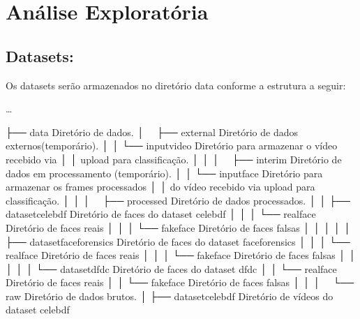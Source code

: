 \documentclass[letterpaper,10pt,brazil]{sphinxmanual}
\begin{document}
\chapter{Análise Exploratória}
\label{\detokenize{notebooks/0_EDA:analise-exploratoria}}\label{\detokenize{notebooks/0_EDA::doc}}

\section{Datasets:}
\label{\detokenize{notebooks/0_EDA:datasets}}
\sphinxAtStartPar
Os datasets serão armazenados no diretório data conforme a estrutura a seguir:

\sphinxAtStartPar
…

\begin{sphinxVerbatim}[commandchars=\\\{\}]
├── data                            \PYGZlt{}\PYGZhy{} Diretório de dados.
│   ├── external                    \PYGZlt{}\PYGZhy{} Diretório de dados externos(temporário).
│   │   └── input\PYGZus{}video             \PYGZlt{}\PYGZhy{} Diretório para armazenar o vídeo recebido via 
│   │                                  upload para classificação.
│   │   
│   ├── interim                     \PYGZlt{}\PYGZhy{} Diretório de dados em processamento (temporário).
│   │   └── input\PYGZus{}face              \PYGZlt{}\PYGZhy{} Diretório para armazenar os frames processados 
│   │                                  do vídeo recebido via upload para classificação.
│   │
│   ├── processed                   \PYGZlt{}\PYGZhy{} Diretório de dados processados.
│   │   ├── dataset\PYGZus{}celebdf         \PYGZlt{}\PYGZhy{} Diretório de faces do dataset celebdf
│   │   │   └── real\PYGZus{}face           \PYGZlt{}\PYGZhy{} Diretório de faces reais
│   │   │   └── fake\PYGZus{}face           \PYGZlt{}\PYGZhy{} Diretório de faces falsas
│   │   │
│   │   ├── dataset\PYGZus{}faceforensics   \PYGZlt{}\PYGZhy{} Diretório de faces do dataset faceforensics
│   │   │   └── real\PYGZus{}face           \PYGZlt{}\PYGZhy{} Diretório de faces reais
│   │   │   └── fake\PYGZus{}face           \PYGZlt{}\PYGZhy{} Diretório de faces falsas
│   │   │
│   │   └── dataset\PYGZus{}dfdc            \PYGZlt{}\PYGZhy{} Diretório de faces do dataset dfdc
│   │       └── real\PYGZus{}face           \PYGZlt{}\PYGZhy{} Diretório de faces reais
│   │       └── fake\PYGZus{}face           \PYGZlt{}\PYGZhy{} Diretório de faces falsas
│   │   
│   └── raw                         \PYGZlt{}\PYGZhy{} Diretório de dados brutos.
│       ├── dataset\PYGZus{}celebdf         \PYGZlt{}\PYGZhy{} Diretório de vídeos do dataset celebdf

\end{sphinxVerbatim}
\end{document}
